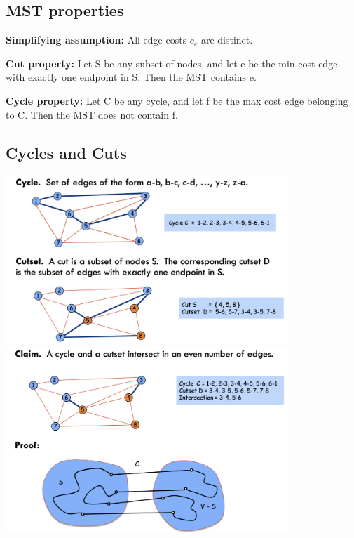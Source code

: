 \documentclass[12pt]{article}
\newcommand{\1}{\space \quad}
\newcommand{\2}{\quad \quad \quad}
\newcommand{\3}{\quad \quad \quad \quad \space}
\newcommand{\4}{\quad \quad \quad \quad \quad \quad}
\newcommand{\5}{\quad \quad \quad \quad \quad \quad \quad \space}
\begin{document}
\subsection{MST properties}
\textbf{Simplifying assumption:} All edge costs $c_e$ are distinct.

\vspace{10pt}
\textbf{Cut property:} Let S be any subset of nodes, and let e be the min cost edge with exactly one endpoint 
in S. Then the MST contains e.

\vspace{10pt}
\textbf{Cycle property:} Let C be any cycle, and let f be the max cost edge belonging to C. Then the MST does
not contain f.

\subsection{Cycles and Cuts}
\begin{center}
  \includegraphics[width=0.8\textwidth]{image22.png}
  \includegraphics[width=0.8\textwidth]{image23.png}
\end{center}

\end{document}
